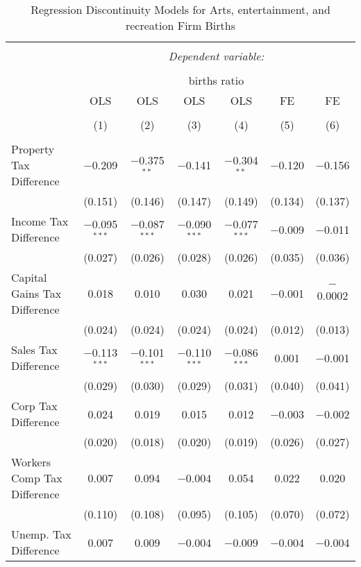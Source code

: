 
\begin{table}[!htbp] \centering 
  \caption{Regression Discontinuity Models for  Arts, entertainment, and recreation Firm Births} 
  \label{71rd} 
\begin{tabular}{@{\extracolsep{5pt}}lcccccc} 
\\[-1.8ex]\hline 
\hline \\[-1.8ex] 
 & \multicolumn{6}{c}{\textit{Dependent variable:}} \\ 
\cline{2-7} 
\\[-1.8ex] & \multicolumn{6}{c}{births ratio} \\ 
 & OLS & OLS & OLS & OLS & FE & FE \\ 
\\[-1.8ex] & (1) & (2) & (3) & (4) & (5) & (6)\\ 
\hline \\[-1.8ex] 
 Property Tax Difference & $-$0.209 & $-$0.375$^{**}$ & $-$0.141 & $-$0.304$^{**}$ & $-$0.120 & $-$0.156 \\ 
  & (0.151) & (0.146) & (0.147) & (0.149) & (0.134) & (0.137) \\ 
  Income Tax Difference & $-$0.095$^{***}$ & $-$0.087$^{***}$ & $-$0.090$^{***}$ & $-$0.077$^{***}$ & $-$0.009 & $-$0.011 \\ 
  & (0.027) & (0.026) & (0.028) & (0.026) & (0.035) & (0.036) \\ 
  Capital Gains Tax Difference & 0.018 & 0.010 & 0.030 & 0.021 & $-$0.001 & $-$0.0002 \\ 
  & (0.024) & (0.024) & (0.024) & (0.024) & (0.012) & (0.013) \\ 
  Sales Tax Difference & $-$0.113$^{***}$ & $-$0.101$^{***}$ & $-$0.110$^{***}$ & $-$0.086$^{***}$ & 0.001 & $-$0.001 \\ 
  & (0.029) & (0.030) & (0.029) & (0.031) & (0.040) & (0.041) \\ 
  Corp Tax Difference & 0.024 & 0.019 & 0.015 & 0.012 & $-$0.003 & $-$0.002 \\ 
  & (0.020) & (0.018) & (0.020) & (0.019) & (0.026) & (0.027) \\ 
  Workers Comp Tax Difference & 0.007 & 0.094 & $-$0.004 & 0.054 & 0.022 & 0.020 \\ 
  & (0.110) & (0.108) & (0.095) & (0.105) & (0.070) & (0.072) \\ 
  Unemp. Tax Difference & 0.007 & 0.009 & $-$0.004 & $-$0.009 & $-$0.004 & $-$0.004 \\ 

\end{tabular}
\end{table}
